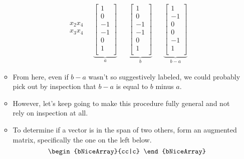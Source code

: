 \documentclass[../notes.tex]{subfiles}
\begin{document}
\begin{itemize}
\begin{itemize}
\begin{align*}
\begin{matrix}
                x_2x_4\\
                x_3x_4\\
            \end{matrix}
            \quad
            \underbrace{
                \begin{bmatrix}
                    1\\
                    0\\
                    -1\\
                    -1\\
                    0\\
                    1\\
                \end{bmatrix}
            }_a&&
            \underbrace{
                \begin{bmatrix}
                    1\\
                    0\\
                    -1\\
                    -1\\
                    0\\
                    1\\
                \end{bmatrix}
            }_b&&
            \underbrace{
                \begin{bmatrix}
                    1\\
                    -1\\
                    0\\
                    0\\
                    -1\\
                    1\\
                \end{bmatrix}
            }_{b-a}
        \end{align*}
        \item From here, even if $b-a$ wasn't so suggestively labeled, we could probably pick out by inspection that $b-a$ is equal to $b$ minus $a$.
        \item However, let's keep going to make this procedure fully general and not rely on inspection at all.
        \item To determine if a vector is in the span of two others, form an augmented matrix, specifically the one on the left below.
        \begin{equation*}
            \begin{bNiceArray}{cc|c}

\end{bNiceArray}
\end{equation*}
\end{itemize}
\end{itemize}
\end{document}

